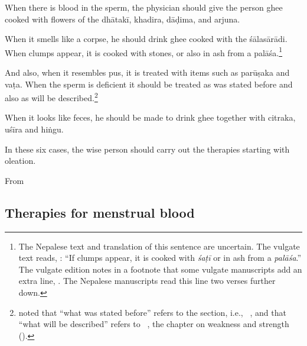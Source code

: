 \begin{translation}
 \begin{sloka}
     When there is blood in the sperm, the physician should give the person ghee 
 cooked with 
 flowers of the \gls{dhātakī},
 \gls{khadira},
 \gls{dāḍima},
 and \gls{arjuna}.
 \end{sloka}
 
 \item [3.2.8]
 
\begin{sloka}
     When it smells like a corpse, he should drink ghee cooked with the
\gls{śālasārādi}. %
\dag When clumps appear, it is cooked with stones, or also in ash from a
\gls{palāśa}.\footnote{The Nepalese text and translation of this sentence
    are uncertain. The vulgate text reads, :  “If clumps appear, it is cooked with
    \emph{śaṭī} or in ash from a \emph{palāśa}.”  The vulgate edition notes in a 
    footnote that some vulgate manuscripts add an extra line, . The Nepalese manuscripts read this line two verses 
    further 
    down.}


 

 \item[9]
 
And also, when it resembles pus, it is treated with items such as
\gls{parūṣaka} and \gls{vaṭa}.  When the sperm is deficient it should be
treated as was stated before and also as will be
described.\footnote{ noted that “what was stated
    before” refers to the  section, i.e., \SS\
    , and that “what will be described” refers to \SS\
    , the chapter on weakness and strength
    (\dev{kṣīṇabalīya}).}
 
 \item [10]
 
 When it looks like feces, he should be made to drink ghee together with
\gls{citraka}, \gls{uśīra} and \gls{hiṅgu}.
 
\item[10a] In these six cases, the wise person should carry out the therapies 
starting with oleation.

\end{sloka} 

\item[10aa]

From

\subsection{Therapies for menstrual blood}


\end{translation}
